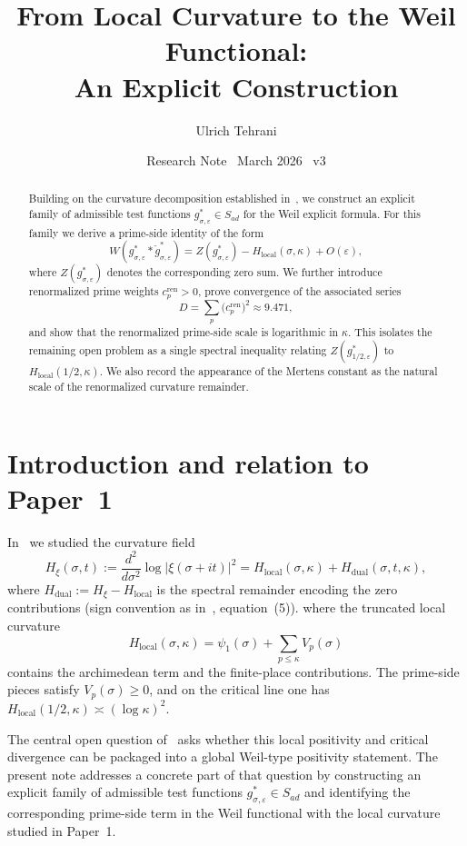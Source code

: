 \documentclass[11pt]{article}
\title{\vspace{-1.5em}\bfseries
From Local Curvature to the Weil Functional:\\[0.4em]
\large An Explicit Construction}
\author{Ulrich Tehrani}
\date{Research Note \textperiodcentered\ March 2026 \textperiodcentered\ v3}
\begin{document}
\maketitle

\begin{abstract}
Building on the curvature decomposition established in~\cite{paper1},
we construct an explicit family of admissible test functions
$g^*_{\sigma,\varepsilon} \in S_{ad}$ for the Weil explicit formula.
For this family we derive a prime-side identity of the form
\[
W(g^*_{\sigma,\varepsilon} * \check g^*_{\sigma,\varepsilon})
=
Z(g^*_{\sigma,\varepsilon}) - H_{\mathrm{local}}(\sigma,\kappa) + O(\varepsilon),
\]
where $Z(g^*_{\sigma,\varepsilon})$ denotes the corresponding zero sum.
We further introduce renormalized prime weights
$c_p^{\mathrm{ren}} > 0$, prove convergence of the associated series
\[
D = \sum_p \bigl(c_p^{\mathrm{ren}}\bigr)^2 \approx 9.471,
\]
and show that the renormalized prime-side scale is logarithmic in $\kappa$.
This isolates the remaining open problem as a single spectral inequality
relating $Z(g^*_{1/2,\varepsilon})$ to $H_{\mathrm{local}}(1/2,\kappa)$.
We also record the appearance of the Mertens constant as the natural scale
of the renormalized curvature remainder.
\end{abstract}

\section{Introduction and relation to Paper~1}

In~\cite{paper1} we studied the curvature field
\[
H_{\xi}(\sigma,t)
:= \frac{d^2}{d\sigma^2}\log|\xi(\sigma+it)|^2
= H_{\mathrm{local}}(\sigma,\kappa) + H_{\mathrm{dual}}(\sigma,t,\kappa),
\]
where $H_{\mathrm{dual}} := H_{\xi} - H_{\mathrm{local}}$ is the spectral
remainder encoding the zero contributions (sign convention as in~\cite{paper1},
equation~(5)).
where the truncated local curvature
\[
H_{\mathrm{local}}(\sigma,\kappa) = \psi_1(\sigma)
+ \sum_{p\le\kappa} V_p(\sigma)
\]
contains the archimedean term and the finite-place contributions. The prime-side pieces satisfy
$V_p(\sigma) \ge 0$, and on the critical line one has
$H_{\mathrm{local}}(1/2,\kappa) \asymp (\log\kappa)^2$.

The central open question of~\cite[\S7]{paper1} asks whether this local
positivity and critical divergence can be packaged into a global
Weil-type positivity statement. The present note addresses a concrete part of
that question by constructing an explicit family of admissible test functions
$g^*_{\sigma,\varepsilon} \in S_{ad}$ and identifying the corresponding
prime-side term in the Weil functional with the local curvature studied in
Paper~1.
\end{document}
